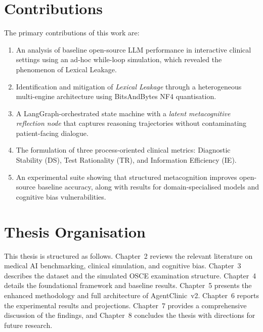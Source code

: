 \section{Contributions}

The primary contributions of this work are:
\begin{enumerate}
    \item An analysis of baseline open-source LLM performance in interactive clinical settings using an ad-hoc while-loop simulation, which revealed the phenomenon of Lexical Leakage.
    \item Identification and mitigation of \textit{Lexical Leakage} through a heterogeneous multi-engine architecture using BitsAndBytes NF4 quantisation.
    \item A LangGraph-orchestrated state machine with a \textit{latent metacognitive reflection node} that captures reasoning trajectories without contaminating patient-facing dialogue.
    \item The formulation of three process-oriented clinical metrics: Diagnostic Stability (DS), Test Rationality (TR), and Information Efficiency (IE).
    \item An experimental suite showing that structured metacognition improves open-source baseline accuracy, along with results for domain-specialised models and cognitive bias vulnerabilities.
\end{enumerate}

\section{Thesis Organisation}

This thesis is structured as follows. Chapter~2 reviews the relevant literature on medical AI benchmarking, clinical simulation, and cognitive bias. Chapter~3 describes the dataset and the simulated OSCE examination structure. Chapter~4 details the foundational framework and baseline results. Chapter~5 presents the enhanced methodology and full architecture of AgentClinic~v2. Chapter~6 reports the experimental results and projections. Chapter~7 provides a comprehensive discussion of the findings, and Chapter~8 concludes the thesis with directions for future research.
